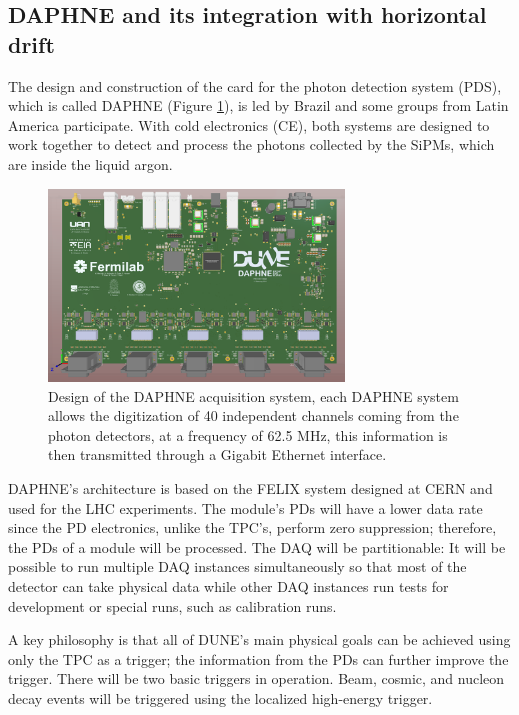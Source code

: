 \documentclass[a4paper,10pt,epsfig,epsf,amsfonts,amsmath]{article}
\begin{document}
\subsection{DAPHNE and its integration with horizontal drift}

The design and construction of the card for the photon detection system (PDS), which is called DAPHNE (Figure \ref{Fig_X2}), is led by Brazil and some groups from Latin America participate. With cold electronics (CE), both systems are designed to work together to detect and process the photons collected by the SiPMs, which are inside the liquid argon.



\begin{figure}[hbtp]
\centering
\includegraphics[width=0.7\textwidth]{Daphne.png}
\caption{Design of the DAPHNE acquisition system, each DAPHNE system allows the digitization of 40 independent channels coming from the photon detectors, at a frequency of 62.5 MHz, this information is then transmitted through a Gigabit Ethernet interface.}
\label{Fig_X2}
\end{figure}

DAPHNE's architecture is based on the FELIX system designed at CERN and used for the LHC experiments. The module's PDs will have a lower data rate since the PD electronics, unlike the TPC's, perform zero suppression; therefore, the PDs of a module will be processed. The DAQ will be partitionable: It will be possible to run multiple DAQ instances simultaneously so that most of the detector can take physical data while other DAQ instances run tests for development or special runs, such as calibration runs.

A key philosophy is that all of DUNE's main physical goals can be achieved using only the TPC as a trigger; the information from the PDs can further improve the trigger. There will be two basic triggers in operation. Beam, cosmic, and nucleon decay events will be triggered using the localized high-energy trigger.
\end{document}
